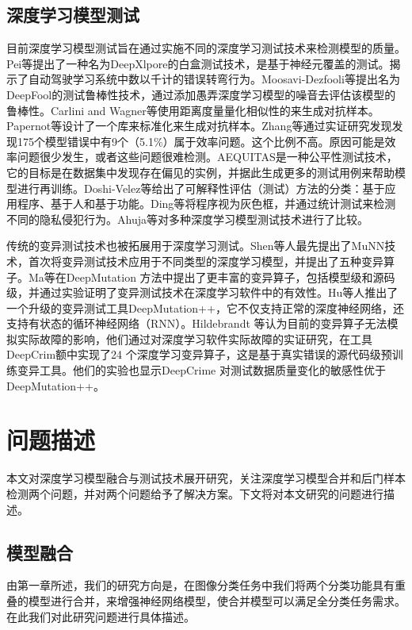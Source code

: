 \documentclass[fontset=macnew,UTF8]{article} %
\begin{document}
\subsection{深度学习模型测试}
目前深度学习模型测试旨在通过实施不同的深度学习测试技术来检测模型的质量。Pei等\cite{pei2017deepxplore}提出了一种名为DeepXlpore的白盒测试技术，是基于神经元覆盖的测试。揭示了自动驾驶学习系统中数以千计的错误转弯行为。Moosavi-Dezfooli等\cite{moosavi2016deepfool}提出名为DeepFool的测试鲁棒性技术，通过添加愚弄深度学习模型的噪音去评估该模型的鲁棒性。Carlini and Wagner等\cite{carlini2017towards}使用距离度量量化相似性的来生成对抗样本。Papernot等\cite{goodfellow2016cleverhans,papernot2016technical}设计了一个库来标准化来生成对抗样本。Zhang等\cite{zhang2018empirical}通过实证研究发现发现175个模型错误中有9个（5.1\%）属于效率问题。这个比例不高。原因可能是效率问题很少发生，或者这些问题很难检测。AEQUITAS\cite{saleiro2018aequitas}是一种公平性测试技术，它的目标是在数据集中发现存在偏见的实例，并据此生成更多的测试用例来帮助模型进行再训练。Doshi-Velez等\cite{doshi2017towards}给出了可解释性评估（测试）方法的分类：基于应用程序、基于人和基于功能。Ding等\cite{ding2018detecting}将程序视为灰色框，并通过统计测试来检测不同的隐私侵犯行为。Ahuja等\cite{ahuja2022testing}对多种深度学习模型测试技术进行了比较。

传统的变异测试技术也被拓展用于深度学习测试。Shen等人最先提出了MuNN技术\cite{shen2018munn}，首次将变异测试技术应用于不同类型的深度学习模型，并提出了五种变异算子。Ma等在DeepMutation 方法\cite{ma2018deepmutation}中提出了更丰富的变异算子，包括模型级和源码级，并通过实验证明了变异测试技术在深度学习软件中的有效性。Hu等人\cite{hu2019deepmutation++}推出了一个升级的变异测试工具DeepMutation++，它不仅支持正常的深度神经网络，还支持有状态的循环神经网络（RNN）。Hildebrandt 等认为目前的变异算子无法模拟实际故障的影响，他们通过对深度学习软件实际故障的实证研究，在工具DeepCrim额\cite{humbatova2021deepcrime}中实现了24 个深度学习变异算子，这是基于真实错误的源代码级预训练变异工具。他们的实验也显示DeepCrime 对测试数据质量变化的敏感性优于DeepMutation++。
	


\section{问题描述}
本文对深度学习模型融合与测试技术展开研究，关注深度学习模型合并和后门样本检测两个问题，并对两个问题给予了解决方案。下文将对本文研究的问题进行描述。

\subsection{模型融合}
由第一章所述，我们的研究方向是，在图像分类任务中我们将两个分类功能具有重叠的模型进行合并，来增强神经网络模型，使合并模型可以满足全分类任务需求。在此我们对此研究问题进行具体描述。
\end{document}
